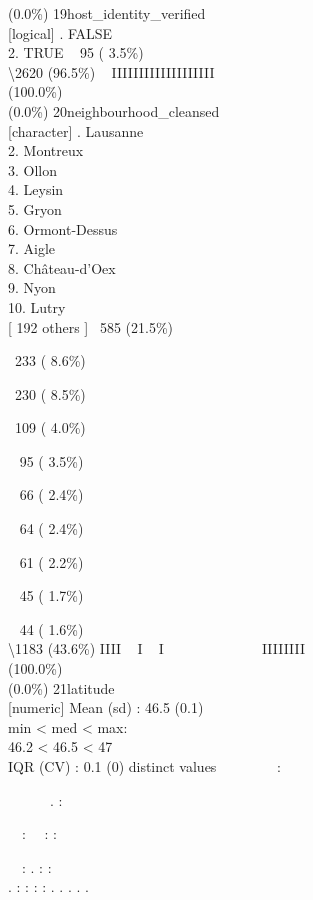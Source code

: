 \documentclass[
  journal,
]{IEEEtran}%
\begin{document}
(0.0\%) \textbar{} \textbar{} 19\textbar host\_identity\_verified\\
{[}logical{]} . FALSE\\
2. TRUE \textbar~ 95 ( 3.5\%)\\
\textbackslash2620 (96.5\%) \textbar{} \textbar~ IIIIIIIIIIIIIIIIIII
\\
(100.0\%) \\
(0.0\%) \textbar{} \textbar{} 20\textbar neighbourhood\_cleansed\\
{[}character{]} . Lausanne\\
2. Montreux\\
3. Ollon\\
4. Leysin\\
5. Gryon\\
6. Ormont-Dessus\\
7. Aigle\\
8. Château-d'Oex\\
9. Nyon\\
10. Lutry\\
{[} 192 others {]} \textbar~585 (21.5\%)\\
\strut ~233 ( 8.6\%)\\
\strut ~230 ( 8.5\%)\\
\strut ~109 ( 4.0\%)\\
\strut ~ 95 ( 3.5\%)\\
\strut ~ 66 ( 2.4\%)\\
\strut ~ 64 ( 2.4\%)\\
\strut ~ 61 ( 2.2\%)\\
\strut ~ 45 ( 1.7\%)\\
\strut ~ 44 ( 1.6\%)\\
\textbackslash1183 (43.6\%) \textbar{} \textbar IIII ~ I ~ I ~ ~ ~ ~ ~ ~
~ ~ IIIIIIII \\
(100.0\%) \\
(0.0\%) \textbar{} \textbar{} 21\textbar latitude\\
{[}numeric{]} \textbar Mean (sd) : 46.5 (0.1)\\
min \textless{} med \textless{} max:\\
46.2 \textless{} 46.5 \textless{} 47\\
IQR (CV) : 0.1 (0)  distinct values \textbar{}
\textbar~~~~~~~~:\\
\strut ~~~~~~. :\\
\strut ~~: ~~: :\\
\strut ~~: . : :\\
. : : : : . . . . . \\
\end{document}
